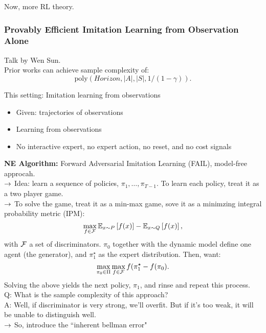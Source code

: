 Now, more RL theory.

\subsubsection{Provably Efficient Imitation Learning from Observation Alone~\cite{sun2019provably}}

Talk by Wen Sun. \\

Prior works can achieve sample complexity of:
\[
\text{poly}(Horizon, |A|, |S|, 1/(1-\gamma)).
\]

This setting: Imitation learning from observations
\begin{itemize}
    \item Given: trajectories of observations
    \item Learning from observations
    \item No interactive expert, no expert action, no reset, and no cost signals
\end{itemize}

{\bf NE Algorithm:} Forward Adversarial Imitation Learning (FAIL), model-free approcah. \\

$\rightarrow$ Idea: learn a sequence of policies, $\pi_1, \ldots, \pi_{T-1}$. To learn each policy, treat it as a two player game. \\

$\rightarrow$ To solve the game, treat it as a min-max game, sove it as a minimzing integral probability metric (IPM):
\[
\max_{f \in \mathcal{F}} \mathbb{E}_{x \sim P}\left[f(x)\right] - \mathbb{E}_{x \sim Q}\left[f(x)\right],
\]
with $\mathcal{F}$ a set of discriminators. $\pi_0$ together with the dynamic model define one agent (the generator), and $\pi_1^\star$ as the expert distribution. Then, want:
\[
\max_{\pi_0 \in \Pi} \max_{f \in \mathcal{F}}f(\pi_1^{\star} - f(\pi_0).
\]
Solving the above yields the next policy, $\pi_1$, and rinse and repeat this process. \\

Q: What is the sample complexity of this approach? \\

A: Well, if discriminator is very strong, we'll overfit. But if it's too weak, it will be unable to distinguish well. \\

$\rightarrow$ So, introduce the ``inherent bellman error"

